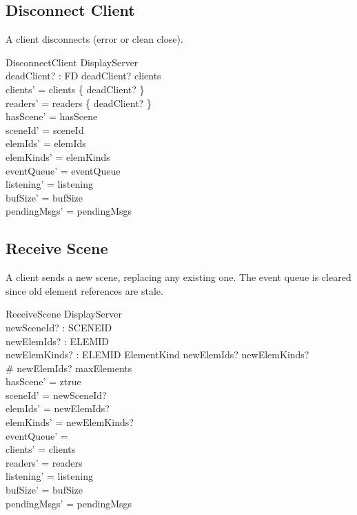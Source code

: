 \documentclass[a4paper,10pt,fleqn]{article}
\begin{document}
\subsection{Disconnect Client}

A client disconnects (error or clean close).

\begin{schema}{DisconnectClient}
  \Delta DisplayServer \\
  deadClient? : FD
  \where
  deadClient? \in clients \\
  clients' = clients \setminus \{ deadClient? \} \\
  readers' = readers \setminus \{ deadClient? \} \\
  hasScene' = hasScene \\
  sceneId' = sceneId \\
  elemIds' = elemIds \\
  elemKinds' = elemKinds \\
  eventQueue' = eventQueue \\
  listening' = listening \\
  bufSize' = bufSize \\
  pendingMsgs' = pendingMsgs
\end{schema}

\subsection{Receive Scene}

A client sends a new scene, replacing any existing one.
The event queue is cleared since old element references are stale.

\begin{schema}{ReceiveScene}
  \Delta DisplayServer \\
  newSceneId? : SCENEID \\
  newElemIds? : \power ELEMID \\
  newElemKinds? : ELEMID \pfun ElementKind
  \where
  newElemIds? \subseteq \dom newElemKinds? \\
  \# newElemIds? \leq maxElements \\
  hasScene' = ztrue \\
  sceneId' = newSceneId? \\
  elemIds' = newElemIds? \\
  elemKinds' = newElemKinds? \\
  eventQueue' = \emptyset \\
  clients' = clients \\
  readers' = readers \\
  listening' = listening \\
  bufSize' = bufSize \\
  pendingMsgs' = pendingMsgs
\end{schema}
\end{document}
